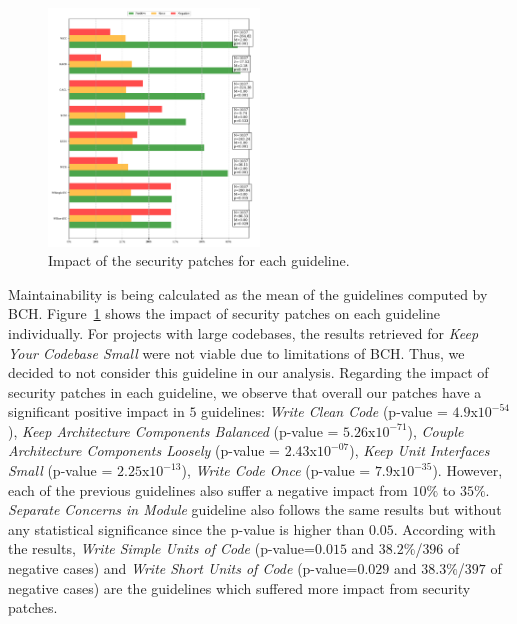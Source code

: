 \documentclass[sigconf,review]{acmart}
\begin{document}
\begin{figure}[h]
 	\centering
 	\includegraphics[width=0.5\textwidth]{figures/impact_per_guideline.pdf}
 	\caption{Impact of the security patches for each guideline.}
	\label{fig:guidelines}
\end{figure}


Maintainability is being calculated as the mean of the guidelines computed
by BCH. Figure~\ref{fig:guidelines} shows the impact of security patches on each 
guideline individually. For projects with large 
codebases, the results retrieved for \emph{Keep Your Codebase Small} were not 
viable due to limitations of BCH. Thus, we decided to not consider this guideline 
in our analysis.
Regarding the impact of security patches in each guideline, we observe
that overall our patches have a significant positive impact in $5$ guidelines: 
\emph{Write Clean Code} (p-value = $4.9$x$10^{-54}$), \emph{Keep Architecture 
Components Balanced} (p-value = $5.26$x$10^{-71}$), \emph{Couple Architecture 
Components Loosely} (p-value = $2.43$x$10^{-07}$), \emph{Keep Unit Interfaces 
Small} (p-value = $2.25$x$10^{-13}$), \emph{ Write Code Once} (p-value = 
$7.9$x$10^{-35}$). However, each of the previous guidelines also suffer a 
negative impact from $10\%$ to $35\%$. \emph{Separate Concerns in Module} 
guideline also follows the same results but without any statistical 
significance since the p-value is higher than $0.05$. According with the 
results, \emph{Write Simple Units of Code} (p-value=$0.015$ and $38.2\%$/$396$ 
of negative cases) and \emph{Write Short Units of Code} (p-value=$0.029$ and 
$38.3\%$/$397$ of negative cases) are the guidelines which suffered more 
impact from security patches. 
 
\end{document}
